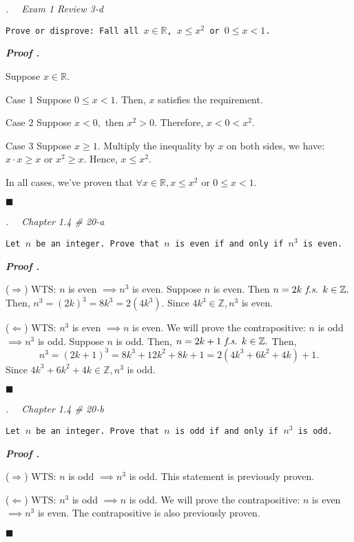 \documentclass[11pt,letter]{article}
\newcounter{nq}[section]
\newcounter{np}[section]
\newenvironment*{p}{\par\noindent\textbf{\textit{Proof \stepcounter{np}\thenp. }}\par}{\par\hfill $\blacksquare$\par}
\newenvironment*{q}[1]{\noindent\emph{\thesection.\stepcounter{nq}\thenq$\quad $ #1}\par\noindent\texttt}{}
\def\Z{{\mathbb{Z}}}
\def\R{{\mathbb{R}}}
\def\fs{\emph{ f.s. }}
\begin{document}
\begin{framed}\begin{q}
	{Exam 1 Review 3-d}
	{Prove or disprove: Fall all $x\in\R$, $x\leq x^2$ or $0\leq x<1$.}
\end{q}\end{framed}
\begin{p}
	Suppose $x\in\R$.\par 
	$\boxed{\text{Case }1}$ Suppose $0\leq x<1.$ Then, $x$ satisfies the requirement.\par 
	$\boxed{\text{Case }2}$	Suppose $x<0,$ then $x^2>0.$ Therefore, $x<0<x^2.$\par 
	$\boxed{\text{Case }3}$ Suppose $x\geq1.$ Multiply the inequality by $x$ on both sides, we have: $x\cdot x\geq x$ or $x^2\geq x.$ Hence, $x\leq x^2.$\par 
	In all cases, we've proven that $\forall x\in\R, x\leq x^2$ or $0\leq x<1.$
\end{p}

\begin{framed}\begin{q}
	{Chapter 1.4 \# 20-a}
	{Let $n$ be an integer. Prove that $n$ is even if and only if $n^3$ is even.}
\end{q}\end{framed}
\begin{p}
	($\Rightarrow$) WTS: $n$ is even $\implies n^3$ is even. Suppose $n$ is even. Then $n=2k\fs k\in\Z.$ Then, $n^3=(2k)^3=8k^3=2(4k^3).$ Since $4k^3\in\Z,n^3$ is even.\par  
	($\Leftarrow$) WTS: $n^3$ is even $\implies n$ is even. We will prove the contrapositive: $n$ is odd $\implies n^3$ is odd. Suppose $n$ is odd. Then, $n=2k+1\fs k\in\Z.$  Then, \[n^3=(2k+1)^3=8k^3+12k^2+8k+1=2(4k^3+6k^2+4k)+1.\] Since $4k^3+6k^2+4k\in\Z,n^3$ is odd.
\end{p}

\begin{framed}\begin{q}
	{Chapter 1.4 \# 20-b}
	{Let $n$ be an integer. Prove that $n$ is odd if and only if $n^3$ is odd.}
\end{q}\end{framed}
\begin{p}
	($\Rightarrow$) WTS: $n$ is odd $\implies n^3$ is odd. This statement is previously proven.\par 
	($\Leftarrow$) WTS: $n^3$ is odd $\implies n$ is odd. We will prove the contrapositive: $n$ is even $\implies n^3$ is even. The contrapositive is also previously proven.
\end{p}
\end{document}
